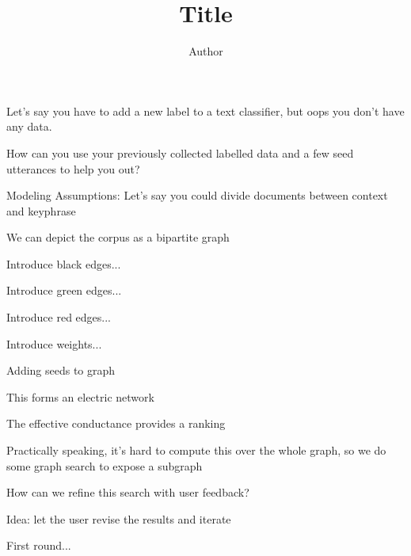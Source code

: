 \documentclass[12pt]{beamer}
\title{Title}
\author[Author]{Author}
\institute{Department of Computer Sciences, University of Wisconsin-Madison}
\begin{document}
\begin{frame}
  \titlepage
\end{frame}

\begin{frame}{}
  Let's say you have to add a new label to a text classifier, but oops you don't have any data.
\end{frame} 

\begin{frame}{}
  How can you use your previously collected labelled data and a few seed utterances to help you out?
\end{frame} 

\begin{frame}{}
  Modeling Assumptions: Let's say you could divide documents between context and keyphrase
\end{frame} 

\begin{frame}{}
  We can depict the corpus as a bipartite graph

  Introduce black edges...

  Introduce green edges...

  Introduce red edges...

  Introduce weights...

  Adding seeds to graph
\end{frame}

\begin{frame}{}
  This forms an electric network
\end{frame}
  
\begin{frame}{}
  The effective conductance provides a ranking
\end{frame}

\begin{frame}{}
  Practically speaking, it's hard to compute this over the whole graph, so we do some graph search to expose a subgraph
\end{frame}

\begin{frame}{}
  How can we refine this search with user feedback?
\end{frame}

\begin{frame}{}
  Idea: let the user revise the results and iterate
\end{frame}

\begin{frame}{}
  First round...
\end{frame}
\end{document}

